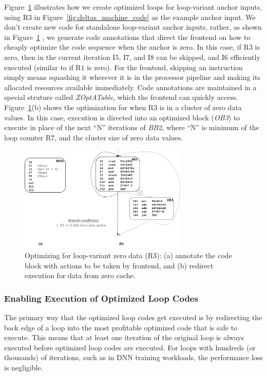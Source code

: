 Figure~\ref{fig:deltas_loop_var_opt} illustrates how we create optimized loops for loop-variant anchor inputs, using R$3$ in Figure~\ref{fig:deltas_machine_code} as the example anchor input.  We don't create new code for standalone loop-variant anchor inputs, rather, as shown in Figure~\ref{fig:deltas_loop_var_opt} , we generate code annotations that direct the frontend on how to cheaply optimize the code sequence when the anchor is zero.  In this case, if R$3$ is zero, then in the current iteration I$5$, I$7$, and I$8$ can be skipped, and I$6$ efficiently executed (similar to  if R$1$ is zero).   For the frontend, skipping an instruction simply means squashing it wherever it is in the processor pipeline and making its allocated resources available immediately.   Code annotations are maintained in a special struture called {\it ZOptATable}, which the frontend can quickly access.  Figure~\ref{fig:deltas_loop_var_opt}(b) shows the optimization for when R$3$ is in a cluster of zero data values.  In this case, execution is directed into an optimized block ({\it OB3}) to execute in place of the next ``N'' iterations of {\it BB2}, where ``N'' is minimum of the loop counter R$7$, and the cluster size of zero data values.    

\begin{figure}[h]
\centering
\includegraphics[height=2in, width=.95\columnwidth]{Figures/loop-variant-zopt.png}
\caption{Optimizing for loop-variant zero data (R3):  (a) annotate the code block with actions to be taken by frontend, and (b) redirect execution for data from zero cache.}
\label{fig:deltas_loop_var_opt}
\end{figure}

\subsubsection{Enabling Execution of Optimized Loop Codes}
The primary way that the optimized loop codes get executed is by redirecting the back edge of a loop into the most profitable optimized code that is safe to execute.  This means that at least one iteration of the original loop is always executed before optimized loop codes are executed.  For loops with hundreds (or thousands) of iterations, such as in DNN training workloads, the performance loss is negligible.


